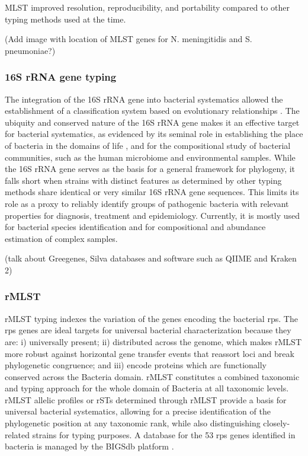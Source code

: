 \ac{MLST} improved resolution, reproducibility, and portability compared to other typing methods used at the time.

(Add image with location of MLST genes for N. meningitidis and S. pneumoniae?)

\subsubsection{16S rRNA gene typing}

The integration of the 16S \ac{rRNA} gene into bacterial systematics allowed the establishment of a classification system based on evolutionary relationships \cite{jolley_ribosomal_2012, woese_towards_1990}. The ubiquity and conserved nature of the 16S \ac{rRNA} gene makes it an effective target for bacterial systematics, as evidenced by its seminal role in establishing the place of bacteria in the domains of life \cite{woese_bacterial_1987}, and for the compositional study of bacterial communities, such as the human microbiome and environmental samples. While the 16S \ac{rRNA} gene serves as the basis for a general framework for phylogeny, it falls short when strains with distinct features as determined by other typing methods share identical or very similar 16S \ac{rRNA} gene sequences. This limits its role as a proxy to reliably identify groups of pathogenic bacteria with relevant properties for diagnosis, treatment and epidemiology. Currently, it is mostly used for bacterial species identification and for compositional and abundance estimation of complex samples.

(talk about Greegenes, Silva databases and software such as QIIME and Kraken 2)

\subsubsection{rMLST}

\ac{rMLST} typing indexes the variation of the genes encoding the bacterial \ac{rps}. The \ac{rps} genes are ideal targets for universal bacterial characterization because they are: i) universally present; ii) distributed across the genome, which makes \ac{rMLST} more robust against horizontal gene transfer events that reassort loci and break phylogenetic congruence; and iii) encode proteins which are functionally conserved across the Bacteria domain. \ac{rMLST} constitutes a combined taxonomic and typing approach for the whole domain of Bacteria at all taxonomic levels. \ac{rMLST} allelic profiles or \ac{rSTs} determined through \ac{rMLST} provide a basis for universal bacterial systematics, allowing for a precise identification of the phylogenetic position at any taxonomic rank, while also distinguishing closely-related strains for typing purposes. A database for the 53 \ac{rps} genes identified in bacteria is managed by the \ac{BIGSdb} platform \cite{maiden_mlst_2013}.

